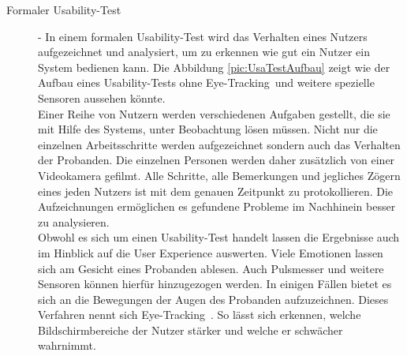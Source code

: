 \begin{description}
 
%
% 
% 




%
%
%
\item[Formaler Usability-Test]
- In einem formalen Usability-Test wird das Verhalten eines Nutzers aufgezeichnet und analysiert, um zu erkennen wie gut ein Nutzer ein System bedienen kann. Die Abbildung \ref{pic:UsaTestAufbau} zeigt wie der Aufbau eines Usability-Tests ohne \glqq Eye-Tracking\grqq\ und weitere spezielle Sensoren aussehen könnte.\\
Einer Reihe von Nutzern werden verschiedenen Aufgaben gestellt, die sie mit Hilfe des Systems, unter Beobachtung lösen müssen. Nicht nur die einzelnen Arbeitsschritte werden aufgezeichnet sondern auch das Verhalten der Probanden. Die einzelnen Personen werden daher zusätzlich von einer Videokamera gefilmt. Alle Schritte, alle Bemerkungen und jegliches Zögern eines jeden Nutzers ist mit dem genauen Zeitpunkt zu protokollieren. Die Aufzeichnungen ermöglichen es gefundene Probleme im Nachhinein besser zu analysieren. \cite[S. 230f.]{Moser:2012cn} \\
Obwohl es sich um einen Usability-Test handelt lassen die Ergebnisse auch im Hinblick auf die User Experience auswerten. Viele Emotionen lassen sich am Gesicht eines Probanden ablesen. Auch Pulsmesser und weitere Sensoren können hierfür hinzugezogen werden. In einigen Fällen bietet es sich an die Bewegungen der Augen des Probanden aufzuzeichnen. Dieses Verfahren nennt sich \glqq Eye-Tracking\grqq\ . So lässt sich erkennen, welche Bildschirmbereiche der Nutzer stärker und welche er schwächer wahrnimmt. \\ 


\end{description}
